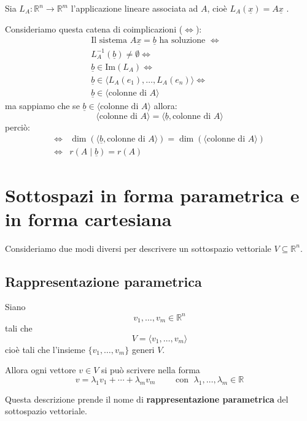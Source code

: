 \documentclass[
  a4paper,
]{article}
\begin{document}
\begin{proofbox}
Sia \(L_A : \mathbb{R}^n \to \mathbb{R}^m\) l'applicazione lineare
associata ad \(A\), cioè \(L_A(\underline{x}) = A \underline{x}\) .

Consideriamo questa catena di coimplicazioni (\(\iff\)): \[
\begin{aligned}
\text{Il sistema } A\underline{x} = \underline{b} \text{ ha soluzione }\iff& \\
L_A^{-1}(\underline{b}) \not = \emptyset \iff&\\
\underline{b} \in \text{Im}(L_A) \iff&\\
\underline{b} \in \langle L_A (e_1), \dots, L_A(e_n) \rangle \iff& \\
\underline{b} \in \langle \text{colonne di } A \rangle
\end{aligned}
\] ma sappiamo che se
\(\underline{b} \in \langle \text{colonne di } A \rangle\) allora: \[
\langle \text{colonne di } A \rangle = \langle \underline{b}, \text{colonne di } A \rangle
\] perciò: \[
\begin{aligned}
\iff& \dim(\langle \underline{b},  \text{colonne di } A \rangle)  =\dim(\langle \text{colonne di } A \rangle) \\
\iff& r(A \mid \underline{b}) = r(A)
\end{aligned}
\]
\end{proofbox}

\newpage

\hypertarget{sottospazi-in-forma-parametrica-e-in-forma-cartesiana}{%
\section{Sottospazi in forma parametrica e in forma
cartesiana}\label{sottospazi-in-forma-parametrica-e-in-forma-cartesiana}}

Consideriamo due modi diversi per descrivere un sottospazio vettoriale
\(V \subseteq \mathbb{R}^n\).

\hypertarget{rappresentazione-parametrica}{%
\subsection{Rappresentazione
parametrica}\label{rappresentazione-parametrica}}

\begin{definitionbox}
Siano \[
v_1,\dots,v_m \in \mathbb{R}^n
\] tali che \[
V=\langle v_1,\dots,v_m\rangle
\] cioè tali che l'insieme \(\{v_1,\dots,v_m\}\) generi \(V\).

Allora ogni vettore \(v\in V\) si può scrivere nella forma \[
v=\lambda_1 v_1+\cdots+\lambda_m v_m \qquad \text{ con } \;\lambda_1,\dots,\lambda_m\in\mathbb{R}
\]

Questa descrizione prende il nome di \textbf{rappresentazione
parametrica} del sottospazio vettoriale.
\end{definitionbox}
\end{document}

